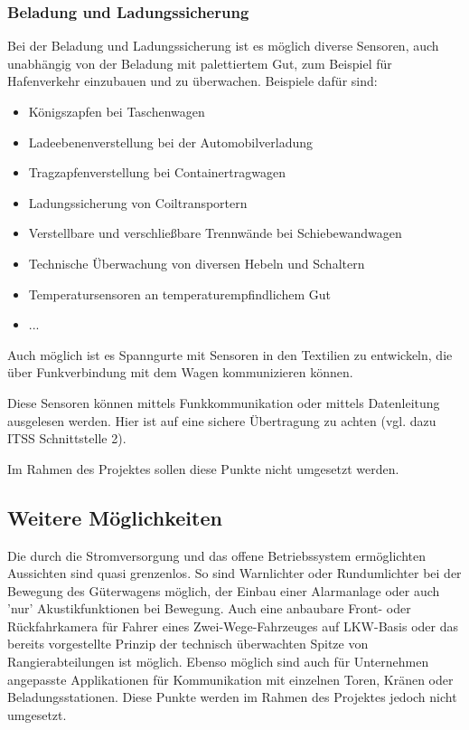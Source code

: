 \subsubsection{Beladung und Ladungssicherung}
Bei der Beladung und Ladungssicherung ist es möglich diverse Sensoren, auch unabhängig von der Beladung mit palettiertem Gut, zum Beispiel für Hafenverkehr einzubauen und zu überwachen. Beispiele dafür sind:
\begin{itemize}
    \item Königszapfen bei Taschenwagen
    \item Ladeebenenverstellung bei der Automobilverladung
    \item Tragzapfenverstellung bei Containertragwagen
    \item Ladungssicherung von Coiltransportern
    \item Verstellbare und verschließbare Trennwände bei Schiebewandwagen
    \item Technische Überwachung von diversen Hebeln und Schaltern
    \item Temperatursensoren an temperaturempfindlichem Gut
    \item ...
\end{itemize}
Auch möglich ist es Spanngurte mit Sensoren in den Textilien zu entwickeln, die über Funkverbindung mit dem Wagen kommunizieren können.\par
Diese Sensoren können mittels Funkkommunikation oder mittels Datenleitung ausgelesen werden. Hier ist auf eine sichere Übertragung zu achten (vgl. dazu ITSS Schnittstelle 2).\par
Im Rahmen des Projektes sollen diese Punkte nicht umgesetzt werden.

\subsection{Weitere Möglichkeiten}
Die durch die Stromversorgung und das offene Betriebssystem ermöglichten Aussichten sind quasi grenzenlos. So sind Warnlichter oder Rundumlichter bei der Bewegung des Güterwagens möglich, der Einbau einer Alarmanlage oder auch 'nur' Akustikfunktionen bei Bewegung. Auch eine anbaubare Front- oder Rückfahrkamera für Fahrer eines Zwei-Wege-Fahrzeuges auf LKW-Basis oder das bereits vorgestellte Prinzip der technisch überwachten Spitze von Rangierabteilungen\cite{RTUS} ist möglich. Ebenso möglich sind auch für Unternehmen angepasste Applikationen für Kommunikation mit einzelnen Toren, Kränen oder Beladungsstationen. Diese Punkte werden im Rahmen des Projektes jedoch nicht umgesetzt.
